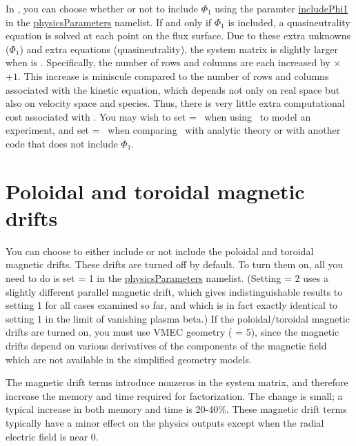 In \sfincs, you can choose whether or not to
include $\Phi_1$ using the paramter {\ttfamily \hyperlink{includePhi1}{includePhi1}} in the 
{\ttfamily \hyperref[sec:physicsParameters]{physicsParameters}}
namelist.  If and only if $\Phi_1$ is included, a quasineutrality equation is solved
at each point on the flux surface.  Due to these extra unknowns ($\Phi_1$) and extra equations
(quasineutrality), the system matrix is slightly larger when  is \true.
Specifically, the number of rows and columns are each increased by \Ntheta$\times$\Nzeta$+1$.  This increase is miniscule compared
to the number of rows and columns associated with the kinetic equation, which depends not only on real space
but also on velocity space and species.  Thus, there is very little extra computational cost associated
with .  You may wish to set  = \true~when
using \sfincs~to model an experiment, and set  = \false~when
comparing \sfincs~with analytic theory or with another code that does not include $\Phi_1$.

\section{Poloidal and toroidal magnetic drifts}

You can choose to either include or not include the poloidal and toroidal magnetic drifts.
These drifts are turned off by default.  To turn them on, all you need to do is
set  = 1 in the {\ttfamily \hyperref[sec:physicsParameters]{physicsParameters}} namelist.
(Setting  = 2 uses a slightly different parallel magnetic drift, which gives
indistinguishable results to setting 1 for all cases examined so far, and which is in fact exactly identical to setting 1
in the limit of vanishing plasma beta.)
If the poloidal/toroidal magnetic drifts are turned on, you must use VMEC
geometry ( = 5), since the magnetic drifts
depend on various derivatives of the components of the magnetic field which
are not available in the simplified geometry models.

The magnetic drift terms introduce nonzeros in the system matrix,
and therefore increase the memory and time required for factorization.
The change is small; a typical increase in both memory and time is 20-40\%.
These magnetic drift terms typically have a minor effect on the physics outputs except when the radial
electric field is near 0.

